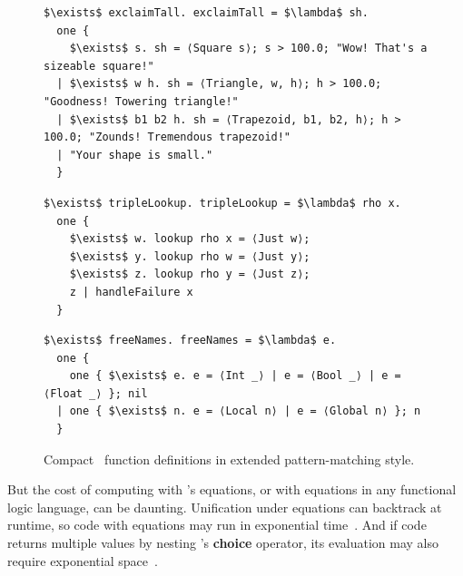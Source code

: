 \documentclass[runningheads]{llncs}
\begin{document}
\begin{figure}[t]
  \centering
  \begin{minipage}[t]{0.54\linewidth}
    \verselst
    \begin{lstlisting}
$\exists$ exclaimTall. exclaimTall = $\lambda$ sh. 
  one { 
    $\exists$ s. sh = ⟨Square s⟩; s > 100.0; "Wow! That's a sizeable square!"
  | $\exists$ w h. sh = ⟨Triangle, w, h⟩; h > 100.0; "Goodness! Towering triangle!"
  | $\exists$ b1 b2 h. sh = ⟨Trapezoid, b1, b2, h⟩; h > 100.0; "Zounds! Tremendous trapezoid!"
  | "Your shape is small."
  }
    \end{lstlisting}
    \vspace{-0.3em}
  \end{minipage}
  \hfill
  \begin{minipage}[t]{0.44\linewidth}
    \verselst
    \begin{lstlisting}
$\exists$ tripleLookup. tripleLookup = $\lambda$ rho x. 
  one { 
    $\exists$ w. lookup rho x = ⟨Just w⟩;
    $\exists$ y. lookup rho w = ⟨Just y⟩;
    $\exists$ z. lookup rho y = ⟨Just z⟩;
    z | handleFailure x
  }
    \end{lstlisting}
    \vspace{-0.3em}
  \end{minipage}
  \vspace{0.5em}

  \begin{minipage}[t]{0.9\linewidth}
    \verselst
    \begin{lstlisting}
$\exists$ freeNames. freeNames = $\lambda$ e.
  one {
    one { $\exists$ e. e = ⟨Int _⟩ | e = ⟨Bool _⟩ | e = ⟨Float _⟩ }; nil
  | one { $\exists$ n. e = ⟨Local n⟩ | e = ⟨Global n⟩ }; n
  }
    \end{lstlisting}
    \vspace{-0.3em}
  \end{minipage}

  \caption{Compact \VC~function definitions in extended pattern-matching style.}
  \label{fig:verseextfuncs}
\end{figure}


But the cost of computing with \VC's equations, 
or with equations in any functional logic language,
can be daunting.
Unification under equations can backtrack at runtime, so code with
equations may run in exponential
time~\cite{hanus2013functional,wadler1985replace,clark1982introduction}. %
And if code returns multiple values by nesting \VC's \textbf{choice}
operator, its evaluation may also require exponential space~\cite{verse}.
\end{document}
